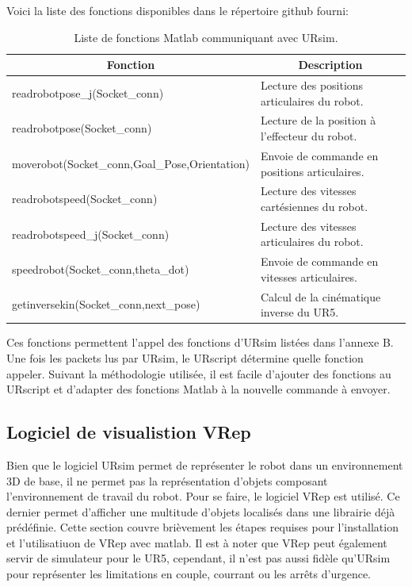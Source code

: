 \documentclass[root.tex]{subfiles}
\begin{document}
Voici la liste des fonctions disponibles dans le répertoire github fourni:

\begin{table}

\caption{Liste de fonctions Matlab communiquant avec URsim.}
\begin{center}
\begin{tabular}{ |l |l| }
\hline
\multicolumn{1}{|c}{Fonction} & \multicolumn{1}{c|}{Description} \\
\hline
\hline
 readrobotpose\_j(Socket\_conn) & Lecture des positions articulaires du robot. \\ 
 \hline
 readrobotpose(Socket\_conn) & Lecture de la position à l'effecteur du robot. \\
 \hline  
 moverobot(Socket\_conn,Goal\_Pose,Orientation) & Envoie de commande en positions articulaires.\\
\hline 
 readrobotspeed(Socket\_conn) & Lecture des vitesses cartésiennes du robot.\\
\hline 
 readrobotspeed\_j(Socket\_conn) & Lecture des vitesses articulaires du robot.\\
\hline
 speedrobot(Socket\_conn,theta\_dot) & Envoie de commande en vitesses articulaires.\\
\hline
 getinversekin(Socket\_conn,next\_pose) & Calcul de la cinématique inverse du UR5.\\
 \hline
\end{tabular}
\end{center}
\end{table}
Ces fonctions permettent l'appel des fonctions d'URsim listées dans l'annexe B.
Une fois les packets lus par URsim, le URscript détermine quelle fonction appeler.
Suivant la méthodologie utilisée, il est facile d'ajouter des fonctions au URscript et d'adapter des fonctions Matlab à la nouvelle commande à envoyer.

\subsection{Logiciel de visualistion VRep}

Bien que le logiciel URsim permet de représenter le robot dans un environnement 3D de base, il ne permet pas la représentation d'objets composant l'environnement de travail du robot.
Pour se faire, le logiciel VRep est utilisé.
Ce dernier permet d'afficher une multitude d'objets localisés dans une librairie déjà prédéfinie.
Cette section couvre brièvement les étapes requises pour l'installation et l'utilisatiuon de VRep avec matlab.
Il est à noter que VRep peut également servir de simulateur pour le UR5, cependant, il n'est pas aussi fidèle qu'URsim pour représenter les limitations en couple, courrant ou les arrêts d'urgence.
\end{document}
